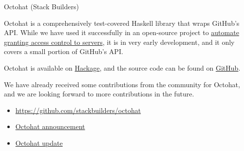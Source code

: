 \begin{hcarentry}[new]{Octohat (Stack Builders)}
\makeheader

Octohat is a comprehensively test-covered Haskell library that wraps
GitHub's API. While we have used it successfully in an open-source
project to
\href{https://hackage.haskell.org/package/openssh-github-keys}{automate
  granting access control to servers}, it is in very early
development, and it only covers a small portion of GitHub's API.

Octohat is available on
\href{http://hackage.haskell.org/package/octohat}{Hackage}, and
the source code can be found on
\href{https://github.com/stackbuilders/octohat}{GitHub}.

We have already received some contributions from the community for
Octohat, and we are looking forward to more contributions in the
future.

\FurtherReading
\begin{itemize}
\item
  \url{https://github.com/stackbuilders/octohat}
\item
  \href{http://www.stackbuilders.com/news/announcing-octohat-a-new-haskell-wrapper-for-github-s-api}{Octohat announcement}
\item
  \href{http://www.stackbuilders.com/news/new-octohat-release}{Octohat update}
\end{itemize}
\end{hcarentry}

